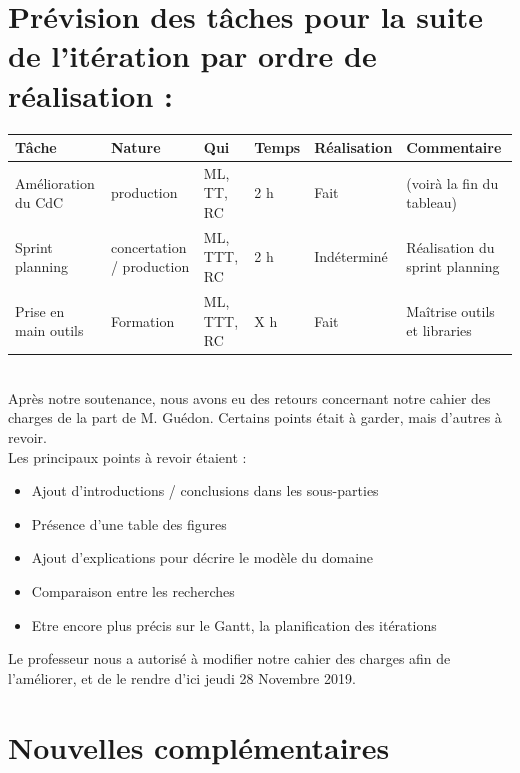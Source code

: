 \documentclass[12pt,titlepage,french]{article}
\begin{document}
\section{Prévision des tâches pour la suite de l'itération par ordre de réalisation :}

\noindent\begin{tabularx}{17cm}{|p{2.5cm}|p{2.5cm}|p{1cm}|p{1.5cm}|p{2.5cm}|X|}
    \hline
    \textbf{Tâche} & \textbf{Nature} & \textbf{Qui} & \textbf{Temps} & \textbf{Réalisation} & \textbf{Commentaire} \\
    \hline
    Amélioration du CdC & production & ML, TT, RC & 2 h & Fait & (voirà la fin du tableau)\\
    \hline
    Sprint planning & concertation / production & ML, TTT, RC & 2 h & Indéterminé & Réalisation du sprint planning\\
    \hline
    Prise en main outils & Formation & ML, TTT, RC & X h & Fait & Maîtrise outils et libraries \\
    \hline
\end{tabularx} \\

Après notre soutenance, nous avons eu des retours concernant notre cahier des charges de la part de M. Guédon. Certains points était à garder, mais d'autres à revoir.\\
Les principaux points à revoir étaient :
\begin{itemize}
\item Ajout d'introductions / conclusions dans les sous-parties
\item Présence d'une table des figures
\item Ajout d'explications pour décrire le modèle du domaine
\item Comparaison entre les recherches
\item Etre encore plus précis sur le Gantt, la planification des itérations
\end{itemize}
Le professeur nous a autorisé à modifier notre cahier des charges afin de l'améliorer, et de le rendre d'ici jeudi 28 Novembre 2019.


\section{Nouvelles complémentaires}
\end{document}
